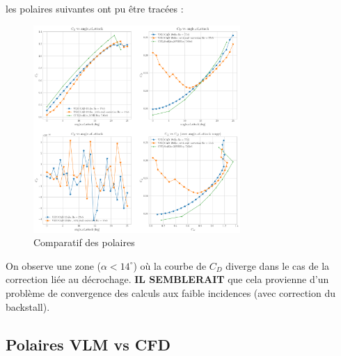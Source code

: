 \documentclass[conference]{IEEEtran}
\begin{document}
les polaires suivantes ont pu être tracées :
\begin{figure}[H]
    \centering
    \includegraphics[width=0.7\textwidth]{Pics/Polar VSM CFD.png}
    \caption{Comparatif des polaires}
    \label{fig:Comparatif des polaires}
\end{figure}

On observe une zone ($\alpha < 14^{\circ}$) où la courbe de $C_D$ diverge dans le cas de la correction liée au décrochage. \textbf{IL SEMBLERAIT} que cela provienne d'un problème de convergence des calculs aux faible incidences (avec correction du backstall). 

\subsection{Polaires VLM vs CFD} 
\end{document}
